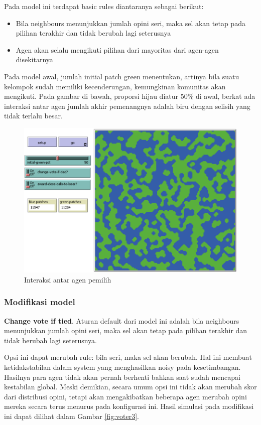 Pada model ini terdapat basic rules diantaranya sebagai berikut:

\begin{itemize}
	\item Bila neighbours menunjukkan jumlah opini seri, maka sel akan tetap pada pilihan terakhir dan tidak berubah lagi seterusnya

	\item Agen akan selalu mengikuti pilihan dari mayoritas dari agen-agen disekitarnya
\end{itemize}

Pada model awal, jumlah initial patch green menentukan, artinya bila suatu kelompok sudah memiliki kecenderungan, kemungkinan komunitas akan mengikuti. Pada gambar di bawah, proporsi hijau diatur 50\% di awal, berkat ada interaksi antar agen jumlah akhir pemenangnya adalah biru dengan selisih yang tidak terlalu besar.

\begin{figure}[H]
	\centering
	\includegraphics[width=\linewidth]{images/ch02/Voter2}
	\caption{Interaksi antar agen pemilih}
	\label{fig:voter2}
\end{figure}

\subsubsection{Modifikasi model}

\textbf{Change vote if tied}. Aturan default dari model ini adalah bila neighbours menunjukkan jumlah opini seri, maka sel akan tetap pada pilihan terakhir dan tidak berubah lagi seterusnya.

Opsi ini dapat merubah rule: bila seri, maka sel akan berubah. Hal ini membuat ketidakstabilan  dalam system yang menghasilkan noisy pada kesetimbangan. Hasilnya para agen tidak akan pernah berhenti bahkan saat sudah mencapai kestabilan global. Meski demikian, secara umum opsi ini tidak akan merubah skor dari distribusi opini, tetapi akan mengakibatkan beberapa agen merubah opini mereka secara terus menurus pada konfigurasi ini. Hasil simulasi pada modifikasi ini dapat dilihat dalam Gambar \ref{fig:voter3}.

